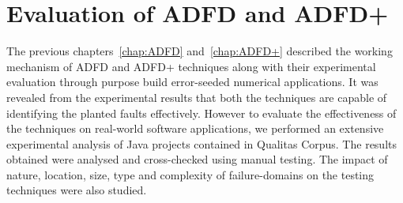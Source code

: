 
\chapter{Evaluation of ADFD and ADFD+}
\label{chap:futureWork}
	

The previous chapters~\ref{chap:ADFD} and~\ref{chap:ADFD+} described the working mechanism of ADFD and ADFD+ techniques along with their experimental evaluation through purpose build error-seeded numerical applications. It was revealed from the experimental results that both the techniques are capable of identifying the planted faults effectively. However to evaluate the effectiveness of the techniques on real-world software applications, we performed an extensive experimental analysis of Java projects contained in Qualitas Corpus. The results obtained were analysed and cross-checked using manual testing. The impact of nature, location, size, type and complexity of failure-domains on the testing techniques were also studied. 




